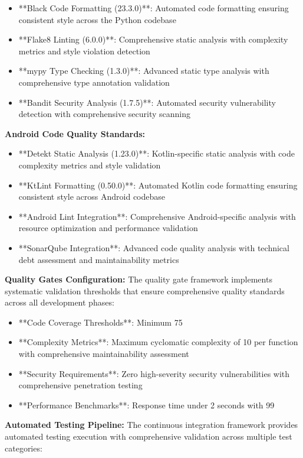 \documentclass[12pt,a4paper]{article}
\begin{document}
\begin{itemize}
\item **Black Code Formatting (23.3.0)**: Automated code formatting ensuring consistent style across the Python codebase
\item **Flake8 Linting (6.0.0)**: Comprehensive static analysis with complexity metrics and style violation detection
\item **mypy Type Checking (1.3.0)**: Advanced static type analysis with comprehensive type annotation validation
\item **Bandit Security Analysis (1.7.5)**: Automated security vulnerability detection with comprehensive security scanning

\end{itemize}
\textbf{Android Code Quality Standards:}

\begin{itemize}
\item **Detekt Static Analysis (1.23.0)**: Kotlin-specific static analysis with code complexity metrics and style validation
\item **KtLint Formatting (0.50.0)**: Automated Kotlin code formatting ensuring consistent style across Android codebase
\item **Android Lint Integration**: Comprehensive Android-specific analysis with resource optimization and performance
  validation
\item **SonarQube Integration**: Advanced code quality analysis with technical debt assessment and maintainability metrics

\end{itemize}
\textbf{Quality Gates Configuration:}
The quality gate framework implements systematic validation thresholds that ensure comprehensive quality standards
across all development phases:

\begin{itemize}
\item **Code Coverage Thresholds**: Minimum 75%
\item **Complexity Metrics**: Maximum cyclomatic complexity of 10 per function with comprehensive maintainability assessment
\item **Security Requirements**: Zero high-severity security vulnerabilities with comprehensive penetration testing
\item **Performance Benchmarks**: Response time under 2 seconds with 99%

\end{itemize}
\textbf{Automated Testing Pipeline:}
The continuous integration framework provides automated testing execution with comprehensive validation across multiple
test categories:
\end{document}
